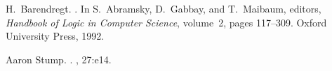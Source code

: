 
\begin{thebibliography}{1}

H.~Barendregt.
.
\newblock In S.~Abramsky, D.~Gabbay, and T.~Maibaum, editors, {\em {Handbook of
  Logic in Computer Science}}, volume~2, pages 117--309. Oxford University
  Press, 1992.

Aaron Stump.
.
, 27:e14.

\end{thebibliography}



